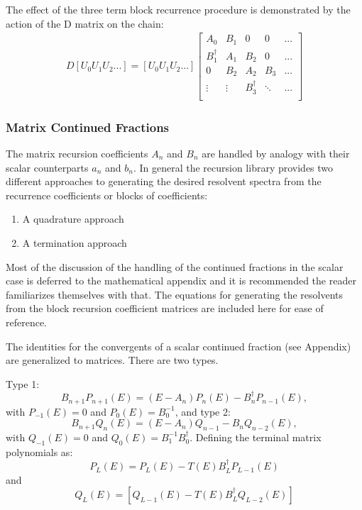 The effect of the three term block recurrence procedure
is demonstrated by the action of the D matrix on the 
chain:
%
\begin{align*}
D\left[U_{0}U_{1}U_{2}...\right] = [U_{0}U_{1}U_{2}...] 
                  \begin{bmatrix}       A_{0}           & B_{1}  & 0                &   0    & ...  \\
                                        B_{1}^{\dagger} & A_{1}  & B_{2}            &   0    & ...  \\
                                        0               & B_{2}  & A_{2}            & B_{3}  & ...  \\
                                        \vdots          & \vdots & B^{\dagger}_{3}  & \ddots & ...  \\
                  \end{bmatrix}
\end{align*}
%

\subsubsection{Matrix Continued Fractions}
The matrix recursion coefficients $A_{n}$ and $B_{n}$ are handled by
analogy with their scalar counterparts $a_{n}$ and $b_{n}$. 
In general the recursion library provides two 
different approaches to generating 
the desired resolvent spectra from the 
recurrence coefficients or blocks of coefficients:
%
\begin{enumerate}
\item A quadrature approach
\item A termination approach
\end{enumerate}
%

Most of the discussion 
of the handling of the continued fractions in the scalar case
is deferred to the mathematical appendix and it is recommended 
the reader familiarizes themselves with that. The equations for
generating the resolvents from the block 
recursion coefficient matrices are 
included here for ease of reference.

The identities for the convergents of a scalar continued fraction (see Appendix)
are generalized to matrices. There are two types.

Type 1:
\begin{equation}
B_{n+1}P_{n+1}(E) = (E-A_{n})P_{n}(E) -B^{\dagger}_{n}P_{n-1}(E),
\end{equation}
%
with $P_{-1}(E)=0$ and $P_{0}(E)=B_{0}^{-1}$,
and type 2:
%
\begin{equation}
B_{n+1}Q_{n}(E) = (E-A_{n})Q_{n-1} -B_{n}Q_{n-2}(E),
\end{equation}
%
with $Q_{-1}(E)=0$ and $Q_{0}(E)=B_{1}^{-1}B^{\dagger}_{0}$.
%
Defining the terminal matrix polynomials as:
\begin{equation}
P_{L}(E) = P_{L}(E) -T(E)B_{L}^{\dagger}P_{L-1}(E)
\end{equation}
and
\begin{equation}
Q_{L}(E)=[Q_{L-1}(E) -T(E)B_{L}^{\dagger}Q_{L-2}(E)]
\end{equation}

